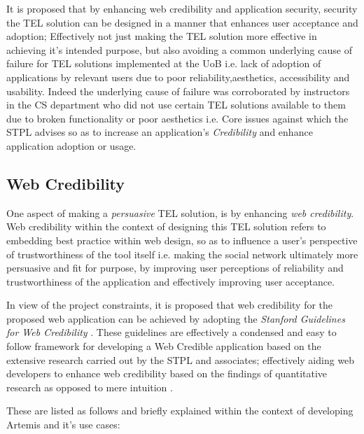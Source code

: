 It is proposed that by enhancing web credibility and application security, security the TEL solution can be designed in a manner that enhances user acceptance and adoption; Effectively not just making the TEL solution more effective in achieving it's intended purpose, but also avoiding a common  underlying cause of failure for TEL solutions implemented at the UoB i.e. lack of adoption of applications by relevant users due to poor reliability,aesthetics, accessibility and usability. Indeed the underlying cause of failure was corroborated by instructors in the CS department who did not use certain TEL solutions available to them due to broken functionality or poor aesthetics i.e. Core issues against which the STPL advises so as to increase an application's \textit{Credibility} \cite{Fogg2002a,Fogg2002,Fogg2001,Fogg1999} and enhance application adoption or usage.








\subsection{Web Credibility}

One aspect of making a \textit{persuasive} TEL solution, is by enhancing \textit{web credibility}. Web credibility within the context of designing this TEL solution refers to embedding best practice within web design, so as to influence a user's perspective of trustworthiness of the tool itself \cite{Fogg2001,Fogg2002} i.e. making the social network ultimately more persuasive and fit for purpose, by improving user perceptions of reliability and trustworthiness of the application \cite{Fogg2001} and effectively improving user acceptance.


In view of the project constraints, it is proposed that web credibility for the proposed web application can be achieved by adopting  the \textit{Stanford Guidelines for Web Credibility} \cite{Fogg2002a}. These guidelines are effectively a condensed and easy to follow framework for developing a Web Credible application based on the extensive research carried out by the STPL and associates; effectively aiding web developers to enhance web credibility based on the findings of quantitative research as opposed to mere intuition \cite{Fogg2002a,Fogg2002,Fogg1999}.

These are listed as follows and briefly explained within the context of developing Artemis  and it's use cases:

